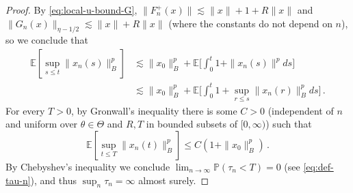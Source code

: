 \documentclass[final]{amsart}
\numberwithin{thm}{section}
\numberwithin{equation}{section}
\newcommand{\E}{\mathbb{E}}
\newcommand{\Prb}{\mathbb{P}}
\begin{document}
\begin{proof}
    
    
    
    
    
    
    
    
    
    
    
    By \eqref{eq:local-u-bound-G}, $\|F_n^+(x)\| \lesssim \|x\| + 1 +R\|x\|$ and $\|G_n(x)\|_{\eta - 1/2} \lesssim \|x\| + R\|x\|$ (where the constants do not depend on $n$), so we conclude that
    \begin{align*}
        \E[\sup_{s \leq t} \|x_n(s)\|_B^p] &\lesssim \|x_0\|_B^p + \E\Big[\int_0^t 1+\|x_n(s)\|^pds\Big] 
        \\
        &\lesssim \|x_0\|_B^p + \E\Big[\int_0^t 1+\sup_{r \leq s}\|x_n(r)\|_B^pds\Big] \,.
    \end{align*}
    For every $T>0$, by Gronwall's inequality there is some $C > 0$ (independent of $n$ and uniform over $\theta \in \Theta$ and $R,T$ in bounded subsets of $[0,\infty)$) such that
    \begin{equation}\label{eq:ubonxn}
        \E[\sup_{t \leq T} \|x_n(t)\|_B^p] \leq C(1+\|x_0\|_B^p) \,.
    \end{equation}
    By Chebyshev's inequality we conclude $\lim_{n \to \infty} \Prb(\tau_n < T) = 0$ (see \eqref{eq:def-tau-n}), and thus $\sup_n \tau_n = \infty$ almost surely.
    

\end{proof}
\end{document}
